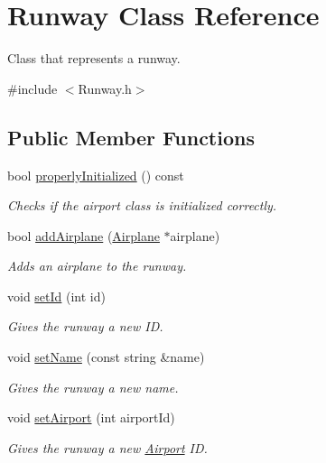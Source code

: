 \hypertarget{class_runway}{}\section{Runway Class Reference}
\label{class_runway}


Class that represents a runway.  




{\ttfamily \#include $<$Runway.\+h$>$}

\subsection*{Public Member Functions}
\begin{DoxyCompactItemize}
\item 
bool \mbox{\hyperlink{class_runway_a360d98246cabf3aa929765f81a656348}{properly\+Initialized}} () const
\begin{DoxyCompactList}\small\item\em Checks if the airport class is initialized correctly. \end{DoxyCompactList}\item 
bool \mbox{\hyperlink{class_runway_ae07554e4e41faea8ef9654385449b25b}{add\+Airplane}} (\mbox{\hyperlink{class_airplane}{Airplane}} $\ast$airplane)
\begin{DoxyCompactList}\small\item\em Adds an airplane to the runway. \end{DoxyCompactList}\item 
void \mbox{\hyperlink{class_runway_af587fc8f841c10a99427cf7a0f442fce}{set\+Id}} (int id)
\begin{DoxyCompactList}\small\item\em Gives the runway a new ID. \end{DoxyCompactList}\item 
void \mbox{\hyperlink{class_runway_ab601d0a69ecffc0042d69cf0eb0cdaba}{set\+Name}} (const string \&name)
\begin{DoxyCompactList}\small\item\em Gives the runway a new name. \end{DoxyCompactList}\item 
void \mbox{\hyperlink{class_runway_a6614626321a1f4c33f24800cbe78d330}{set\+Airport}} (int airport\+Id)
\begin{DoxyCompactList}\small\item\em Gives the runway a new \mbox{\hyperlink{class_airport}{Airport}} ID. \end{DoxyCompactList}\item 

\end{DoxyCompactItemize}
